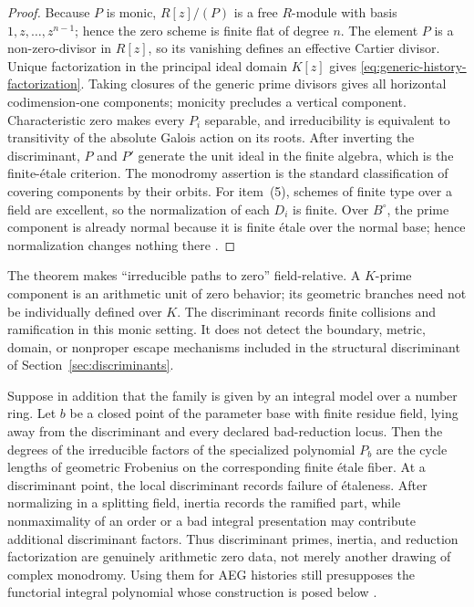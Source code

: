 \begin{proof}
Because $P$ is monic, $R[z]/(P)$ is a free $R$-module with basis
$1,z,\ldots,z^{n-1}$; hence the zero scheme is finite flat of degree $n$.
The element $P$ is a non-zero-divisor in $R[z]$, so its vanishing defines an
effective Cartier divisor.  Unique factorization in the principal ideal domain
$K[z]$ gives \eqref{eq:generic-history-factorization}.  Taking closures of the
generic prime divisors gives all horizontal codimension-one components; monicity
precludes a vertical component.  Characteristic zero makes every $P_i$ separable,
and irreducibility is equivalent to transitivity of the absolute Galois action on
its roots.  After inverting the discriminant, $P$ and $P'$ generate the unit ideal
in the finite algebra, which is the finite-\'etale criterion.  The monodromy
assertion is the standard classification of covering components by their orbits.
For item~(5), schemes of finite type over a field are excellent, so the
normalization of each $D_i$ is finite.  Over $B^\circ$, the prime component is
already normal because it is finite \'etale over the normal base; hence
normalization changes nothing there
\cite{Hartshorne1977AlgebraicGeometry,GrothendieckRaynaud1971SGA1}.
\end{proof}

The theorem makes ``irreducible paths to zero'' field-relative.  A $K$-prime
component is an arithmetic unit of zero behavior; its geometric branches need not
be individually defined over $K$.  The discriminant records finite collisions and
ramification in this monic setting.  It does not detect the boundary, metric,
domain, or nonproper escape mechanisms included in the structural discriminant of
Section~\ref{sec:discriminants}.

\begin{remark}
\label{rem:arithmetic-reduction-interface}
Suppose in addition that the family is given by an integral model over a number
ring.  Let $b$ be a closed point of the parameter base with finite residue field,
lying away from the discriminant and every declared bad-reduction locus.  Then the
degrees of the irreducible factors of the specialized polynomial $P_b$ are the
cycle lengths of geometric Frobenius on the corresponding finite \'etale fiber.
At a discriminant point, the local discriminant records failure of \'etaleness.
After normalizing in a splitting field, inertia records the ramified part, while
nonmaximality of an order or a bad integral presentation may contribute additional
discriminant factors.
Thus discriminant primes, inertia, and reduction factorization are genuinely
arithmetic zero data, not merely another drawing of complex monodromy.  Using
them for AEG histories still presupposes the functorial integral polynomial whose
construction is posed below \cite{Neukirch1999AlgebraicNumberTheory}.
\end{remark}

